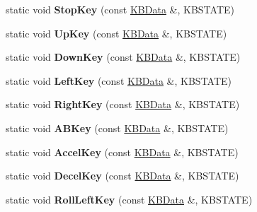 \begin{DoxyCompactItemize}
\item 
static void {\bfseries Stop\+Key} (const \hyperlink{classKBData}{K\+B\+Data} \&, K\+B\+S\+T\+A\+TE)\hypertarget{classFlyByKeyboard_aba10ab2226bf1afcf6a399ee551c98ee}{}\label{classFlyByKeyboard_aba10ab2226bf1afcf6a399ee551c98ee}

\item 
static void {\bfseries Up\+Key} (const \hyperlink{classKBData}{K\+B\+Data} \&, K\+B\+S\+T\+A\+TE)\hypertarget{classFlyByKeyboard_a170096a579c219802bcc5fc146e2780c}{}\label{classFlyByKeyboard_a170096a579c219802bcc5fc146e2780c}

\item 
static void {\bfseries Down\+Key} (const \hyperlink{classKBData}{K\+B\+Data} \&, K\+B\+S\+T\+A\+TE)\hypertarget{classFlyByKeyboard_af9073d95a43fe8aaf891f54c1d56c818}{}\label{classFlyByKeyboard_af9073d95a43fe8aaf891f54c1d56c818}

\item 
static void {\bfseries Left\+Key} (const \hyperlink{classKBData}{K\+B\+Data} \&, K\+B\+S\+T\+A\+TE)\hypertarget{classFlyByKeyboard_a87459e6f2525328ec9030500c6dcecb8}{}\label{classFlyByKeyboard_a87459e6f2525328ec9030500c6dcecb8}

\item 
static void {\bfseries Right\+Key} (const \hyperlink{classKBData}{K\+B\+Data} \&, K\+B\+S\+T\+A\+TE)\hypertarget{classFlyByKeyboard_a9476923bb18b42d92e9d78e56d05cbc4}{}\label{classFlyByKeyboard_a9476923bb18b42d92e9d78e56d05cbc4}

\item 
static void {\bfseries A\+B\+Key} (const \hyperlink{classKBData}{K\+B\+Data} \&, K\+B\+S\+T\+A\+TE)\hypertarget{classFlyByKeyboard_ae2b2b13bf72b50f01abd09f0b1f02165}{}\label{classFlyByKeyboard_ae2b2b13bf72b50f01abd09f0b1f02165}

\item 
static void {\bfseries Accel\+Key} (const \hyperlink{classKBData}{K\+B\+Data} \&, K\+B\+S\+T\+A\+TE)\hypertarget{classFlyByKeyboard_a84a30ba8ad4f327dc0533d6543be478a}{}\label{classFlyByKeyboard_a84a30ba8ad4f327dc0533d6543be478a}

\item 
static void {\bfseries Decel\+Key} (const \hyperlink{classKBData}{K\+B\+Data} \&, K\+B\+S\+T\+A\+TE)\hypertarget{classFlyByKeyboard_a435e0d68f2afce756cf8592d3b9bad81}{}\label{classFlyByKeyboard_a435e0d68f2afce756cf8592d3b9bad81}

\item 
static void {\bfseries Roll\+Left\+Key} (const \hyperlink{classKBData}{K\+B\+Data} \&, K\+B\+S\+T\+A\+TE)\hypertarget{classFlyByKeyboard_a5147b337865e558472fdfd10c62ef8f5}{}\label{classFlyByKeyboard_a5147b337865e558472fdfd10c62ef8f5}


\end{DoxyCompactItemize}
